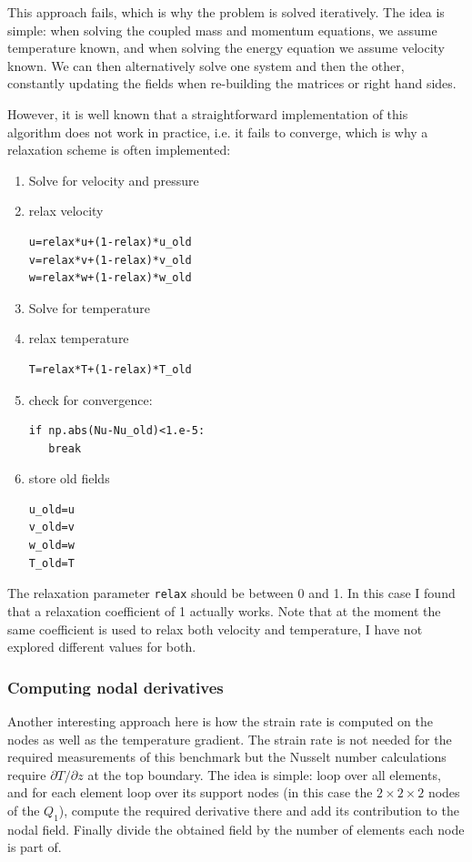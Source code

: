This approach fails, which is why 
the problem is solved iteratively. The idea is simple: when solving the 
coupled mass and momentum equations, we assume temperature known, and when solving the energy equation
we assume velocity known. We can then alternatively solve one system and then the other, constantly 
updating the fields when re-building the matrices or right hand sides.

However, it is well known that a straightforward implementation of this algorithm does not 
work in practice, i.e. it fails to converge, which is why a relaxation scheme is often implemented:
\begin{enumerate}
\item Solve for velocity and pressure
\item relax velocity
\begin{lstlisting}
u=relax*u+(1-relax)*u_old
v=relax*v+(1-relax)*v_old
w=relax*w+(1-relax)*w_old
\end{lstlisting}
\item Solve for temperature
\item relax temperature
\begin{lstlisting}
T=relax*T+(1-relax)*T_old
\end{lstlisting}
\item check for convergence:
\begin{lstlisting}
if np.abs(Nu-Nu_old)<1.e-5:
   break
\end{lstlisting}
\item store old fields
\begin{lstlisting}
u_old=u
v_old=v
w_old=w
T_old=T
\end{lstlisting}
\end{enumerate}
The relaxation parameter \lstinline{relax} should be between 0 and 1.
In this case I found that a relaxation coefficient of 1 actually works.
Note that at the moment the same coefficient is used to relax both velocity and temperature, I have 
not explored different values for both.

\subsubsection*{Computing nodal derivatives}  

Another interesting approach here is how the strain rate is computed on the nodes as well as
the temperature gradient. The strain rate is not needed for the required measurements of this 
benchmark but the Nusselt number calculations require $\partial T/\partial z$ at the top
boundary.    
The idea is simple: loop over all elements, and for each element loop over its support nodes
(in this case the $2\times 2\times 2$ nodes of the $Q_1$), compute the required derivative 
there and add its contribution to the nodal field. Finally divide the obtained field by 
the number of elements each node is part of.

